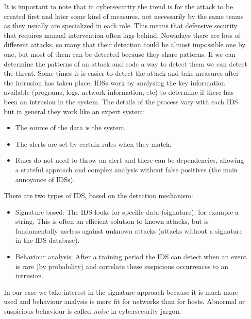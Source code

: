 \linej
\linej
It is important to note that in cybersecurity the trend is for the attack to be created first and later some kind of measures, not necessarily by the same teams as they usually are specialized in each role. This means that defensive security that requires manual intervention often lags behind.
\linej
Nowadays there are lots of different attacks, so many that their detection could be almost impossible one by one, but most of them can be detected because they share patterns. If we can determine the patterns of an attack and code a way to detect them we can detect the threat. Some times it is easier to detect the attack and take measures after the intrusion has taken place.
\linej
\linej
IDSs work by analysing the key information available (programs, logs, network information, etc) to determine if there has been an intrusion in the system. The details of the process vary with each IDS but in general they work like an expert system:
\begin{itemize}
	\item The source of the data is the system.
	\item The alerts are set by certain rules when they match.
	\item Rules do not need to throw an alert and there can be dependencies, allowing a stateful approach and complex analysis without false positives (the main annoyance of IDSs).
\end{itemize}

\linej
There are two types of IDS, based on the detection mechanism:
\begin{itemize}
	\item Signature based: The IDS looks for specific data (signature), for example a string. This is often an efficient solution to known attacks, but is fundamentally useless against unknown attacks (attacks without a signature in the IDS database).
	\item Behaviour analysis: After a training period the IDS can detect when an event is rare (by probability) and correlate these suspicious occurrences to an intrusion.
\end{itemize}
In our case we take interest in the signature approach because it is much more used and behaviour analysis is more fit for networks than for hosts.
Abnormal or suspicious behaviour is called \textit{noise} in cybersecurity jargon.

